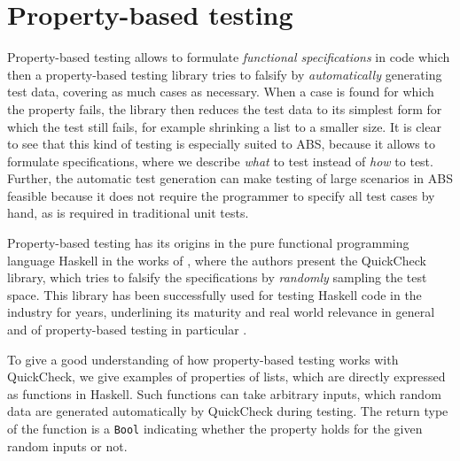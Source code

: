 \section{Property-based testing}
\label{sec:proptesting}
Property-based testing allows to formulate \textit{functional specifications} in code which then a property-based testing library tries to falsify by \textit{automatically} generating test data, covering as much cases as necessary. When a case is found for which the property fails, the library then reduces the test data to its simplest form for which the test still fails, for example shrinking a list to a smaller size. It is clear to see that this kind of testing is especially suited to ABS, because it allows to formulate specifications, where we describe \textit{what} to test instead of \textit{how} to test. %
Further, the automatic test generation can make testing of large scenarios in ABS feasible because it does not require the programmer to specify all test cases by hand, as is required in traditional unit tests.

Property-based testing has its origins in the pure functional programming language Haskell in the works of \cite{claessen_quickcheck_2000,claessen_testing_2002}, where the authors present the QuickCheck library, which tries to falsify the specifications by \textit{randomly} sampling the test space. This library has been successfully used for testing Haskell code in the industry for years, underlining its maturity and real world relevance in general and of property-based testing in particular \cite{hughes_quickcheck_2007}.



To give a good understanding of how property-based testing works with \\ QuickCheck, we give examples of properties of lists, which are directly expressed as functions in Haskell. Such functions can take arbitrary inputs, which random data are generated automatically by QuickCheck during testing. The return type of the function is a \texttt{Bool} indicating whether the property holds for the given random inputs or not.

